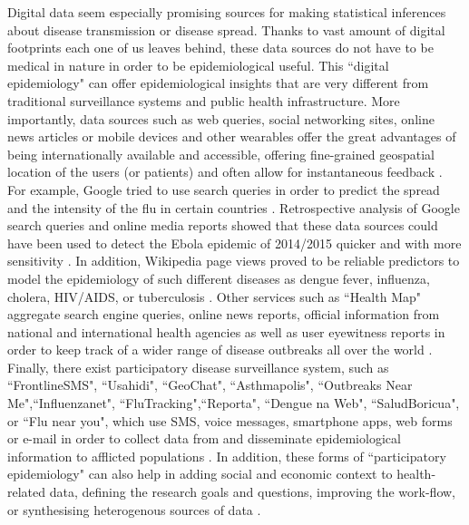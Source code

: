\documentclass[11pt, a4paper]{report}\usepackage[]{graphicx}\usepackage[]{color}
\begin{document}
Digital data seem especially promising sources for making statistical inferences about disease transmission or disease spread. Thanks to vast amount of digital footprints each one of us leaves behind, these data sources do not have to be medical in nature in order to be epidemiological useful. This ``digital epidemiology" can offer epidemiological insights that are very different from traditional surveillance systems and public health infrastructure. More importantly, data sources such as web queries, social networking sites, online news articles or mobile devices and other wearables offer the great advantages of being internationally available and accessible, offering fine-grained geospatial location of the users (or patients) and often allow for instantaneous feedback \citep{salathe_digital_2012}. For example, Google tried to use search queries in order to predict the spread and the intensity of the flu in certain countries \citep{ginsberg_detecting_2009}. Retrospective analysis of Google search queries and online media reports showed that these data sources could have been used to detect the Ebola epidemic of 2014/2015 quicker and with more sensitivity \citep{anema_digital_2014, milinovich_role_2015}.
In addition, Wikipedia page views proved to be reliable predictors to model the epidemiology of such different diseases as dengue fever, influenza, cholera, HIV/AIDS, or tuberculosis \citep{generous_global_2014}. 
Other services such as ``Health Map" aggregate search engine queries, online news reports, official information from national and international health agencies as well as user eyewitness reports in order to keep track of a wider range of disease outbreaks all over the world \citep{brownstein_surveillance_2008,freifeld_healthmap:_2008}.
Finally, there exist participatory disease surveillance system, such as ``FrontlineSMS", ``Usahidi", ``GeoChat", ``Asthmapolis", ``Outbreaks Near Me",``Influenzanet", ``FluTracking",``Reporta", ``Dengue na Web", ``SaludBoricua", or ``Flu near you", which use SMS, voice messages, smartphone apps, web forms or e-mail in order to collect data from and disseminate epidemiological information to afflicted populations \citep{freifeld_participatory_2010,chunara_flu_2013,wojcik_public_2014,chunara_estimating_2015}. In addition, these forms of ``participatory epidemiology" can also help in adding social and economic context to health-related data, defining the research goals and questions, improving the work-flow, or synthesising heterogenous sources of data \citep{bach_participatory_2017,liu_assessing_2017}.\newline
\end{document}
